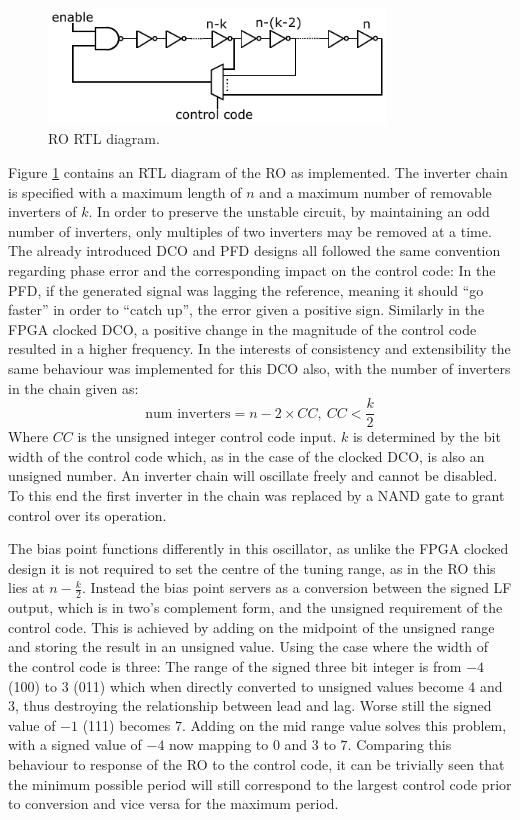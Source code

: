 \begin{figure}[h]
	\centering
	\includegraphics[width=0.8\textwidth]{../ro_new}
	\caption[\acl{RO} RTL diagram]{\acl{RO} RTL diagram.}
	\label{fig:ro_impl}
\end{figure}
Figure \ref{fig:ro_impl} contains an \ac{RTL} diagram of the \ac{RO} as implemented. The inverter chain is specified with a maximum length of $n$ and a maximum number of removable inverters of $k$. In order to preserve the unstable circuit, by maintaining an odd number of inverters, only multiples of two inverters may be removed at a time. The already introduced \ac{DCO} and \ac{PFD} designs all followed the same convention regarding phase error and the corresponding impact on the control code: In the \ac{PFD}, if the generated signal was lagging the reference, meaning it should ``go faster'' in order to ``catch up'', the error given a positive sign. Similarly in the \ac{FPGA} clocked \ac{DCO}, a positive change in the magnitude of the control code resulted in a higher frequency. In the interests of consistency and extensibility the same behaviour was implemented for this \ac{DCO} also, with the number of inverters in the chain given as:
\begin{equation}
\text{num inverters} = n - 2\times CC,~CC<\frac{k}{2}
\end{equation}
Where $CC$ is the unsigned integer control code input. $k$ is determined by the bit width of the control code which, as in the case of the clocked \ac{DCO}, is also an unsigned number. An inverter chain will oscillate freely and cannot be disabled. To this end the first inverter in the chain was replaced by a \acs{NAND} gate to grant control over its operation.

The bias point functions differently in this oscillator, as unlike the \ac{FPGA} clocked design it is not required to set the centre of the tuning range, as in the \ac{RO} this lies at $n-\frac{k}{2}$. Instead the bias point servers as a conversion between the signed \ac{LF} output, which is in two's complement form, and the unsigned requirement of the control code. This is achieved by adding on the midpoint of the unsigned range and storing the result in an unsigned value. Using the case where the width of the control code is three: The range of the signed three bit integer is from $-4$ (100) to $3$ (011) which when directly converted to unsigned values become $4$ and $3$, thus destroying the relationship between lead and lag. Worse still the signed value of $-1$ (111) becomes $7$. Adding on the mid range value solves this problem, with a signed value of $-4$ now mapping to $0$ and $3$ to $7$. Comparing this behaviour to response of the \ac{RO} to the control code, it can be trivially seen that the minimum possible period will still correspond to the largest control code prior to conversion and vice versa for the maximum period.

